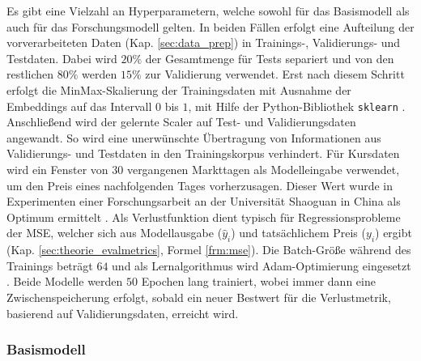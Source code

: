 Es gibt eine Vielzahl an Hyperparametern, welche sowohl für das Basismodell als auch für das Forschungsmodell gelten. 
In beiden Fällen erfolgt eine Aufteilung der vorverarbeiteten Daten (Kap. \ref{sec:data_prep}) in Trainings-, Validierungs- und Testdaten. Dabei wird $20\%$ der Gesamtmenge für Tests separiert und von den restlichen $80\%$ werden $15\%$ zur Validierung verwendet.
Erst nach diesem Schritt erfolgt die MinMax-Skalierung der Trainingsdaten mit Ausnahme der Embeddings auf das Intervall $0$ bis $1$, mit Hilfe der Python-Bibliothek \texttt{sklearn} \autocite{website:ScikitLearn}. Anschließend wird der gelernte Scaler auf Test- und Validierungsdaten angewandt. So wird eine unerwünschte Übertragung von Informationen aus Validierungs- und Testdaten in den Trainingskorpus verhindert. 
Für Kursdaten wird ein Fenster von $30$ vergangenen Markttagen als Modelleingabe verwendet, um den Preis eines nachfolgenden Tages vorherzusagen. Dieser Wert wurde in Experimenten einer Forschungsarbeit an der Universität Shaoguan in China als Optimum ermittelt \autocite[Tabelle 3]{xie2024deep}.
Als Verlustfunktion dient typisch für Regressionsprobleme der \ac{MSE}, welcher sich aus Modellausgabe ($\hat{y}_i$) und tatsächlichem Preis ($y_i$) ergibt (Kap. \ref{sec:theorie_evalmetrics}, Formel \ref{frm:mse}). 
Die Batch-Größe während des Trainings beträgt $64$ und als Lernalgorithmus wird Adam-Optimierung eingesetzt \autocite{website:keras-adam}. 
Beide Modelle werden $50$ Epochen lang trainiert, wobei immer dann eine Zwischenspeicherung erfolgt, sobald ein neuer Bestwert für die Verlustmetrik, basierend auf Validierungsdaten, erreicht wird.


\subsubsection{Basismodell}\label{sec:modellierung_basis_goog}

